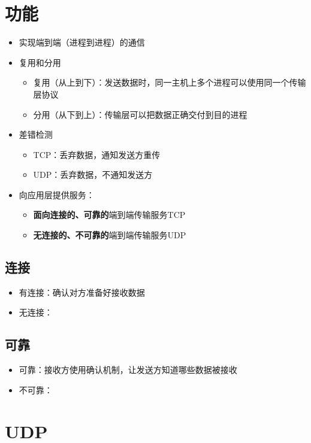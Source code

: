 \section{功能}
\begin{itemize}
    \item 实现端到端（进程到进程）的通信
    \item 复用和分用\begin{itemize}
        \item 复用（从上到下）：发送数据时，同一主机上多个进程可以使用同一个传输层协议
        \item 分用（从下到上）：传输层可以把数据正确交付到目的进程
    \end{itemize}
    \item 差错检测\begin{itemize}
        \item TCP：丢弃数据，通知发送方重传
        \item UDP：丢弃数据，不通知发送方
    \end{itemize}
    \item 向应用层提供服务：\begin{itemize}
        \item \textbf{面向连接的、可靠的}端到端传输服务TCP
        \item \textbf{无连接的、不可靠的}端到端传输服务UDP
    \end{itemize}
\end{itemize}

\subsection{连接}
\begin{itemize}
    \item 有连接：确认对方准备好接收数据
    \item 无连接：
\end{itemize}

\subsection{可靠}
\begin{itemize}
    \item 可靠：接收方使用确认机制，让发送方知道哪些数据被接收
    \item 不可靠：
\end{itemize}


\section{UDP}

